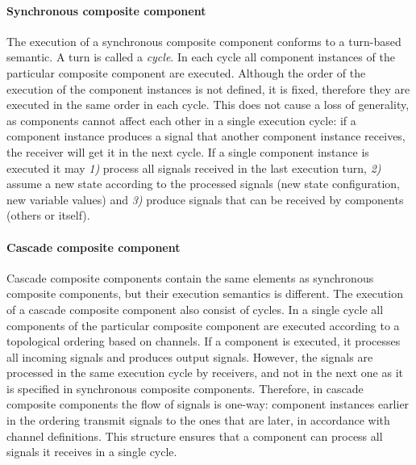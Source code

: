\paragraph{Synchronous composite component} The execution of a synchronous composite component
conforms to a turn-based semantic. A turn is called a \emph{cycle}. In each cycle all component instances of the particular composite component are executed. Although the order of the execution of the component instances is not defined, it is fixed, therefore they are executed in the same order in each cycle. This does not cause a loss of generality, as components cannot affect each other in a single execution cycle: if a component instance produces a signal that another component instance receives, the receiver will get it in the next cycle. If a single component instance is executed it may \textit{1)} process all signals received in the last execution turn, \textit{2)} assume a new state according to the processed signals (new state configuration, new variable values) and \textit{3)} produce signals that can be received by components (others or itself).

\paragraph{Cascade composite component} Cascade composite components contain the same elements
as synchronous composite components, but their execution semantics is different. The
execution of a cascade composite component also consist of cycles. In a single cycle all components
of the particular composite component are executed according to a topological ordering
based on channels. If a component is executed, it processes all incoming signals and produces output
signals. However, the signals are processed in the same
execution cycle by receivers, and not in the next one as it is specified in synchronous composite
components. Therefore, in cascade composite components the flow of signals is one-way:
component instances earlier in the ordering transmit signals to the ones that are later, in
accordance with channel definitions. This structure ensures that a component can process all
signals it receives in a single cycle.


